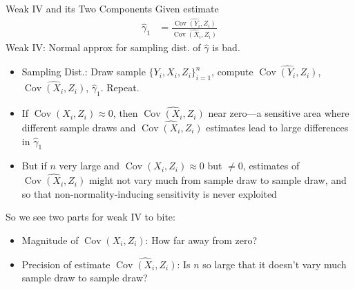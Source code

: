 \documentclass[aspectratio=169, handout]{beamer}
\newcommand{\Cov}{\operatorname{Cov}}
\newcommand{\sumin}{\sum^n_{i=1}}
\begin{document}
{\scriptsize
\begin{frame}{Weak IV and its Two Components}
Given estimate
\begin{align*}
  \hat{\gamma}_1
  &=
  \frac{\widehat{\Cov(Y_i,Z_i)}}{\widehat{\Cov(X_i,Z_i)}}
\end{align*}
\alert{Weak IV}:
Normal approx for sampling dist. of $\hat{\gamma}$ is bad.
\begin{itemize}
  \item \alert{Sampling Dist.}:
    Draw sample $\{Y_i,X_i,Z_i\}_{i=1}^n$, compute
    $\widehat{\Cov(Y_i,Z_i)}$,
    $\widehat{\Cov(X_i,Z_i)}$,
    $\hat{\gamma}_1$.
    Repeat.
  \item If $\Cov(X_i,Z_i)\approx 0$, then $\widehat{\Cov(X_i,Z_i)}$
    near zero---a sensitive area where different sample draws
    and $\widehat{\Cov(X_i,Z_i)}$ estimates lead to large differences in
    $\hat{\gamma}_1$
  \item \alert{But} if $n$ \alert{very large} and
    $\Cov(X_i,Z_i)\approx 0$ but $\neq 0$, estimates of
    $\widehat{\Cov(X_i,Z_i)}$ might not vary much from sample draw to
    sample draw, and so that non-normality-inducing sensitivity is never
    exploited
\end{itemize}
So we see two parts for weak IV to bite:
\begin{itemize}
  \item \alert{Magnitude} of $\Cov(X_i,Z_i)$: How far away from zero?
  \item \alert{Precision} of estimate $\widehat{\Cov(X_i,Z_i)}$:
    Is $n$ so large that it doesn't vary much sample draw to sample
    draw?
\end{itemize}
\end{frame}
}
\end{document}

